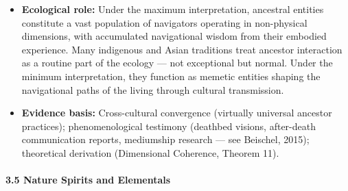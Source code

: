 \begin{itemize}[nosep,leftmargin=*]
  \item \textbf{Ecological role:} Under the maximum interpretation, ancestral entities constitute a vast population of navigators operating in non-physical dimensions, with accumulated navigational wisdom from their embodied experience. Many indigenous and Asian traditions treat ancestor interaction as a routine part of the ecology — not exceptional but normal. Under the minimum interpretation, they function as memetic entities shaping the navigational paths of the living through cultural transmission.
  \item \textbf{Evidence basis:} Cross-cultural convergence (virtually universal ancestor practices); phenomenological testimony (deathbed visions, after-death communication reports, mediumship research — see Beischel, 2015); theoretical derivation (Dimensional Coherence, Theorem 11).
\end{itemize}


\paragraph*{3.5 Nature Spirits and Elementals}

